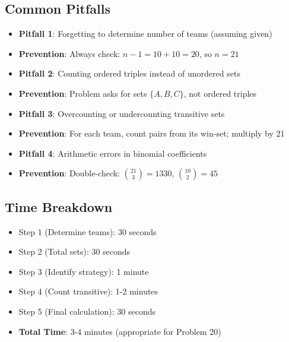 \documentclass[]{article}
\begin{document}
\begin{solutionbox}
\subsection*{Common Pitfalls}
\begin{itemize}[leftmargin=*]
    \item \textbf{Pitfall 1}: Forgetting to determine number of teams (assuming given)
    \item \textbf{Prevention}: Always check: $n-1 = 10+10 = 20$, so $n=21$
    
    \item \textbf{Pitfall 2}: Counting ordered triples instead of unordered sets
    \item \textbf{Prevention}: Problem asks for sets $\{A,B,C\}$, not ordered triples
    
    \item \textbf{Pitfall 3}: Overcounting or undercounting transitive sets
    \item \textbf{Prevention}: For each team, count pairs from its win-set; multiply by 21
    
    \item \textbf{Pitfall 4}: Arithmetic errors in binomial coefficients
    \item \textbf{Prevention}: Double-check: $\binom{21}{3} = 1330$, $\binom{10}{2} = 45$
\end{itemize}

\subsection*{Time Breakdown}
\begin{itemize}[leftmargin=*]
    \item Step 1 (Determine teams): 30 seconds
    \item Step 2 (Total sets): 30 seconds
    \item Step 3 (Identify strategy): 1 minute
    \item Step 4 (Count transitive): 1-2 minutes
    \item Step 5 (Final calculation): 30 seconds
    \item \textbf{Total Time}: 3-4 minutes (appropriate for Problem 20)
\end{itemize}
\end{solutionbox}
\end{document}
